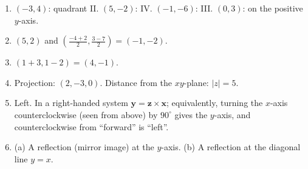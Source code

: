 \begin{enumerate}[label=\textbf{\ansnum.\arabic*}]
  \item $(-3,4)$: quadrant II. $(5,-2)$: IV. $(-1,-6)$: III. $(0,3)$: on the positive $y$-axis.
  \item $(5,2)$ and $\left(\frac{-4+2}{2},\frac{3-7}{2}\right)=(-1,-2)$.
  \item $(1+3,1-2)=(4,-1)$.
  \item Projection: $(2,-3,0)$. Distance from the $xy$-plane: $|z|=5$.
  \item Left. In a right-handed system $\mathbf{y}=\mathbf{z}\times\mathbf{x}$; equivalently, turning the $x$-axis counterclockwise (seen from above) by $90^\circ$ gives the $y$-axis, and counterclockwise from ``forward'' is ``left''.
  \item (a) A reflection (mirror image) at the $y$-axis. (b) A reflection at the diagonal line $y=x$.
\end{enumerate}
